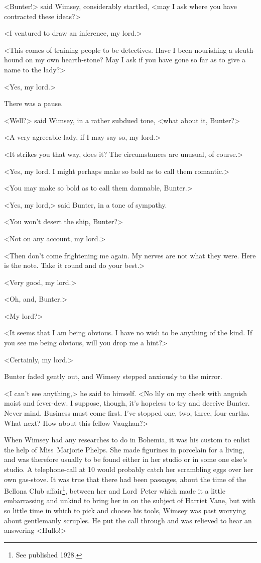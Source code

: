 <Bunter!> said Wimsey, considerably startled, <may I ask where you have contracted these ideas?>

<I ventured to draw an inference, my lord.>

<This comes of training people to be detectives. Have I been nourishing a sleuth-hound on my own hearth-stone? May I ask if you have gone so far as to give a name to the lady?>

<Yes, my lord.>

There was a pause.

<Well?> said Wimsey, in a rather subdued tone, <what about it, Bunter?>

<A very agreeable lady, if I may say so, my lord.>

<It strikes you that way, does it? The circumstances are unusual, of course.>

<Yes, my lord. I might perhaps make so bold as to call them romantic.>

<You may make so bold as to call them damnable, Bunter.>

<Yes, my lord,> said Bunter, in a tone of sympathy.

<You won't desert the ship, Bunter?>

<Not on any account, my lord.>

<Then don't come frightening me again. My nerves are not what they were. Here is the note. Take it round and do your best.>

<Very good, my lord.>

<Oh, and, Bunter.>

<My lord?>

<It seems that I am being obvious. I have no wish to be anything of the kind. If you see me being obvious, will you drop me a hint?>

<Certainly, my lord.>

Bunter faded gently out, and Wimsey stepped anxiously to the mirror.

<I can't see anything,> he said to himself. <No lily on my cheek with anguish moist and fever-dew. I suppose, though, it's hopeless to try and deceive Bunter. Never mind. Business must come first. I've stopped one, two, three, four earths. What next? How about this fellow Vaughan?>

\divider

When Wimsey had any researches to do in Bohemia, it was his custom to enlist the help of Miss~Marjorie Phelps. She made figurines in porcelain for a living, and was therefore usually to be found either in her studio or in some one else's studio. A telephone-call at 10  would probably catch her scrambling eggs over her own gas-stove. It was true that there had been passages, about the time of the Bellona Club affair\footnote{See  published 1928.}, between her and Lord~Peter which made it a little embarrassing and unkind to bring her in on the subject of Harriet Vane, but with so little time in which to pick and choose his tools, Wimsey was past worrying about gentlemanly scruples. He put the call through and was relieved to hear an answering <Hullo!>

